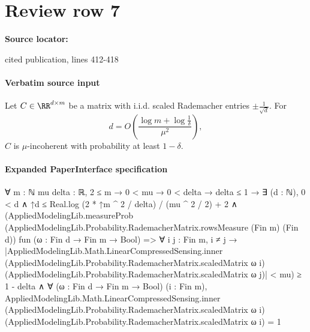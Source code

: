 \documentclass[10pt]{article}
\begin{document}
\section*{Review row 7}
\textbf{Source locator:} {\footnotesize\raggedright cited publication, lines 412-\allowbreak{}418\par}
\paragraph{Verbatim source input}
\begin{ReviewVerbatim}
\begin{lemma}\label{prop:incoherent}
    Let $C\in \RR^{d\times m}$ be a matrix with i.i.d. scaled Rademacher entries $\pm\frac{1}{\sqrt{d}}$. For
    \begin{equation}
        d = O\left(\frac{\log m + \log \frac{1}{\delta}}{\mu^2}\right),
    \end{equation}
    $C$ is $\mu$-incoherent with probability at least $1 - \delta$.
\end{lemma}
\end{ReviewVerbatim}



\paragraph{Expanded PaperInterface specification}
\begin{ReviewVerbatim}
∀ {m : ℕ} {mu delta : ℝ},
  2 ≤ m →
    0 < mu →
      0 < delta →
        delta ≤ 1 →
          ∃ (d : ℕ),
            0 < d ∧
              ↑d ≤ Real.log (2 * ↑m ^ 2 / delta) / (mu ^ 2 / 2) + 2 ∧
                (AppliedModelingLib.measureProb
                      (AppliedModelingLib.Probability.RademacherMatrix.rowsMeasure (Fin m) (Fin d))
                      fun (ω : Fin d → Fin m → Bool) =>
                      ∀ {{i j : Fin m}},
                        i ≠ j →
                          |AppliedModelingLib.Math.LinearCompressedSensing.inner
                                (AppliedModelingLib.Probability.RademacherMatrix.scaledMatrix ω i)
                                (AppliedModelingLib.Probability.RademacherMatrix.scaledMatrix ω j)| <
                            mu) ≥
                    1 - delta ∧
                  ∀ (ω : Fin d → Fin m → Bool) (i : Fin m),
                    AppliedModelingLib.Math.LinearCompressedSensing.inner
                        (AppliedModelingLib.Probability.RademacherMatrix.scaledMatrix ω i)
                        (AppliedModelingLib.Probability.RademacherMatrix.scaledMatrix ω i) =
                      1
\end{ReviewVerbatim}
\end{document}
